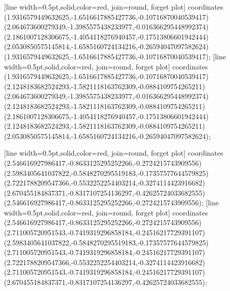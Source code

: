 [line width=0.5pt,solid,color=red, join=round, forget plot] coordinates {(1.9316579449632625,-1.6516617885427736,-0.10716870040539417) (2.064673600279349,-1.3985575438233977,-0.016366295448992374) (2.1861007128306675,-1.4054118276940457,-0.17513806601942444) (2.0530850575145814,-1.6585160724134216,-0.26594047097582624) (1.9316579449632625,-1.6516617885427736,-0.10716870040539417)};
[line width=0.5pt,solid,color=red, join=round, forget plot] coordinates {(1.9316579449632625,-1.6516617885427736,-0.10716870040539417) (2.1248183682524293,-1.5821118163762309,-0.0884109754265211) (2.064673600279349,-1.3985575438233977,-0.016366295448992374) (2.1248183682524293,-1.5821118163762309,-0.0884109754265211) (2.1861007128306675,-1.4054118276940457,-0.17513806601942444) (2.1248183682524293,-1.5821118163762309,-0.0884109754265211) (2.0530850575145814,-1.6585160724134216,-0.26594047097582624)};

[line width=0.5pt,solid,color=red, join=round, forget plot] coordinates {(2.546616927986417,-0.8633125295252266,-0.2724215743909556) (2.5983405641037822,-0.5848270295519183,-0.17357577644579825) (2.7221788209547366,-0.5532252254403214,-0.3274114423916682) (2.670455184837371,-0.8317107254136297,-0.42625724033682555) (2.546616927986417,-0.8633125295252266,-0.2724215743909556)};
[line width=0.5pt,solid,color=red, join=round, forget plot] coordinates {(2.546616927986417,-0.8633125295252266,-0.2724215743909556) (2.711005720951543,-0.7419319296858184,-0.24516217729391107) (2.5983405641037822,-0.5848270295519183,-0.17357577644579825) (2.711005720951543,-0.7419319296858184,-0.24516217729391107) (2.7221788209547366,-0.5532252254403214,-0.3274114423916682) (2.711005720951543,-0.7419319296858184,-0.24516217729391107) (2.670455184837371,-0.8317107254136297,-0.42625724033682555)};

